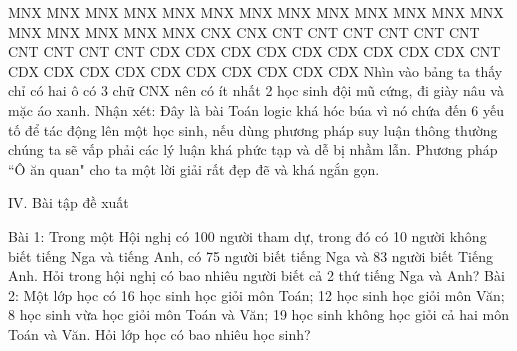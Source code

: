 \begin{multicols}{2}
	MNX	MNX	MNX	MNX	MNX	MNX	MNX	MNX	MNX	MNX
	MNX	MNX	MNX	MNX	MNX	MNX	MNX	MNX	CNX	CNX
	CNT	CNT	CNT	CNT	CNT	CNT	CNT	CNT	CNT	CNT
	CDX	CDX	CDX	CDX	CDX	CDX	CDX	CDX	CDX	CNT
	CDX	CDX	CDX	CDX	CDX	CDX	CDX	CDX	CDX	CDX
	Nhìn vào bảng ta thấy chỉ có hai ô có 3 chữ CNX nên có ít nhất 2 học sinh đội mũ cứng, đi giày nâu và mặc áo xanh.
	Nhận xét: Đây là bài Toán logic khá hóc búa vì nó chứa đến 6 yếu tố để tác động lên một học sinh, nếu dùng phương pháp suy luận thông thường chúng ta sẽ vấp phải các lý luận khá phức tạp và dễ bị nhầm lẫn. Phương pháp ``Ô ăn quan" cho ta một lời giải rất đẹp đẽ và khá ngắn gọn.
	
	IV. Bài tập đề xuất
	
	Bài 1: Trong một Hội nghị có 100 người tham dự, trong đó có 10 người không biết tiếng Nga và tiếng Anh, có 75 người biết tiếng Nga và 83 người biết Tiếng Anh. Hỏi trong hội nghị có bao nhiêu người biết cả 2 thứ tiếng Nga và Anh?
	Bài 2: Một lớp học có 16 học sinh học giỏi môn Toán; 12 học sinh học giỏi môn Văn; 8 học sinh vừa học giỏi môn Toán và Văn; 19 học sinh không học giỏi cả hai môn Toán và Văn. Hỏi lớp học có bao nhiêu học sinh?
	

\end{multicols}
